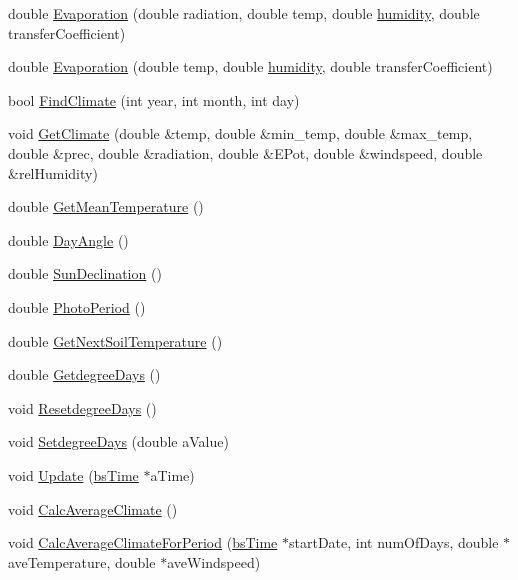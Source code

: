 \begin{DoxyCompactItemize}
\item 
double \hyperlink{classclimate_adf16cf971faa070a3a1f52cca3f25686}{Evaporation} (double radiation, double temp, double \hyperlink{classclimate_a06eef65b4caa3f2fd845f5f0e28420d8}{humidity}, double transferCoefficient)
\item 
double \hyperlink{classclimate_a4efc44cd76e875cd44151c54814a3dff}{Evaporation} (double temp, double \hyperlink{classclimate_a06eef65b4caa3f2fd845f5f0e28420d8}{humidity}, double transferCoefficient)
\item 
bool \hyperlink{classclimate_ac56dc5d8331fa48207444eb12bf8cfef}{FindClimate} (int year, int month, int day)
\item 
void \hyperlink{classclimate_a6b1e57f9fef9480cbd10b8f90a53828b}{GetClimate} (double \&temp, double \&min\_\-temp, double \&max\_\-temp, double \&prec, double \&radiation, double \&EPot, double \&windspeed, double \&relHumidity)
\item 
double \hyperlink{classclimate_a11e09f183aa8f5cd0514972bab9b4a22}{GetMeanTemperature} ()
\item 
double \hyperlink{classclimate_a8c93caa7c165cb2956fccdb29056ebda}{DayAngle} ()
\item 
double \hyperlink{classclimate_a063a1aa7e8e9cdc58c781e67d012c2d3}{SunDeclination} ()
\item 
double \hyperlink{classclimate_a2a5a0fd4f393d95c69ecf170d06513fb}{PhotoPeriod} ()
\item 
double \hyperlink{classclimate_a7aca9683881d45a8bd1111da605adaca}{GetNextSoilTemperature} ()
\item 
double \hyperlink{classclimate_aaa69759553b20e8a2e81d3c9eeabaf53}{GetdegreeDays} ()
\item 
void \hyperlink{classclimate_acd7a190f36febe69da0a91de788c304e}{ResetdegreeDays} ()
\item 
void \hyperlink{classclimate_ae42dad7e08de795d5acdd7a9ebea4996}{SetdegreeDays} (double aValue)
\item 
void \hyperlink{classclimate_a6216fa871a7b4d608ad6587301afc876}{Update} (\hyperlink{classbs_time}{bsTime} $\ast$aTime)
\item 
void \hyperlink{classclimate_a959c6049cbb0c3d517966ef11f0cf0bc}{CalcAverageClimate} ()
\item 
void \hyperlink{classclimate_a315fd3212ace7b479f8abf1b983306df}{CalcAverageClimateForPeriod} (\hyperlink{classbs_time}{bsTime} $\ast$startDate, int numOfDays, double $\ast$aveTemperature, double $\ast$aveWindspeed)
\end{DoxyCompactItemize}
